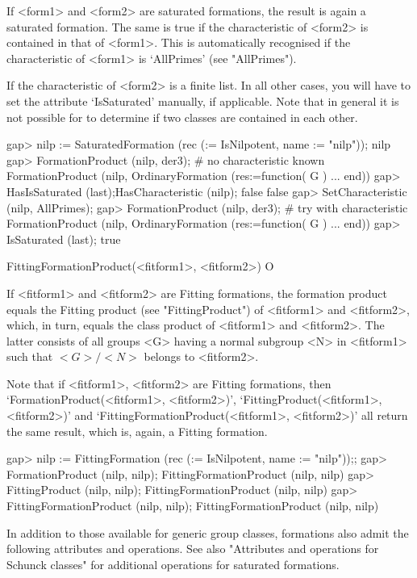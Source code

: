 If <form1> and <form2> are saturated formations, the result
is again a saturated formation. The same is true if the characteristic of
<form2> is contained in that of <form1>. This is automatically recognised if
the characteristic of <form1> is `AllPrimes' (see "AllPrimes").

If the characteristic of <form2> is a finite list. In all other cases, you
will have to set the attribute `IsSaturated' manually, if applicable. Note
that in general it is not possible for {\CRISP} to determine if two classes
are contained in each other.

\beginexample
gap> nilp := SaturatedFormation (rec (\in := IsNilpotent, name := "nilp"));
nilp
gap> FormationProduct (nilp, der3); # no characteristic known
FormationProduct (nilp, OrdinaryFormation (res:=function( G ) ... end))
gap> HasIsSaturated (last);HasCharacteristic (nilp);
false
false
gap> SetCharacteristic (nilp, AllPrimes);
gap> FormationProduct (nilp, der3); # try with characteristic
FormationProduct (nilp, OrdinaryFormation (res:=function( G ) ... end))
gap> IsSaturated (last);
true
\endexample


\>FittingFormationProduct(<fitform1>, <fitform2>) O

If <fitform1> and <fitform2>  are Fitting formations, the formation product
equals the Fitting product (see "FittingProduct") of <fitform1> and
<fitform2>, which, in turn, equals the class product of <fitform1> and
<fitform2>. The latter consists of all groups <G> having a  normal subgroup
<N> in <fitform1> such that $<G>/<N>$ belongs to <fitform2>.

Note that if <fitform1>, <fitform2> are Fitting formations, then 
`FormationProduct(<fitform1>, <fitform2>)', `FittingProduct(<fitform1>,
<fitform2>)' and `FittingFormationProduct(<fitform1>, <fitform2>)' all
return the same result, which is, again, a Fitting formation.


\beginexample
gap> nilp := FittingFormation (rec (\in := IsNilpotent, name := "nilp"));;
gap> FormationProduct (nilp, nilp);
FittingFormationProduct (nilp, nilp)
gap> FittingProduct (nilp, nilp);
FittingFormationProduct (nilp, nilp)
gap> FittingFormationProduct (nilp, nilp);
FittingFormationProduct (nilp, nilp)
\endexample



In addition to those available for generic group classes, formations also
admit the following attributes and operations. See also "Attributes and
operations for Schunck classes" for additional operations for saturated
formations. 

